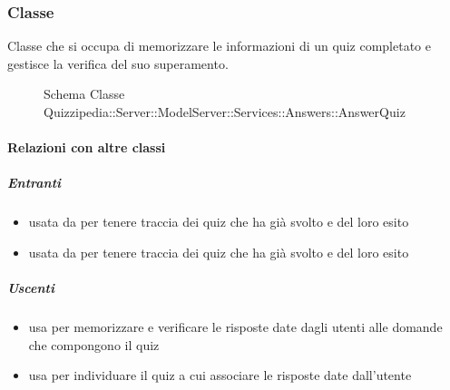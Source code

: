 \subsubsection{Classe }
Classe che si occupa di memorizzare le informazioni di un quiz completato e gestisce la verifica del suo superamento.
\begin{figure}[H]
\centering
\noindent{}
\caption[Schema Classe AnswerQuiz]{Schema Classe Quizzipedia::Server::ModelServer::Services::Answers::AnswerQuiz}
\end{figure}
\paragraph{Relazioni con altre classi}
\subparagraph{Entranti}
\begin{itemize}
\item usata da  per tenere traccia dei quiz che ha già svolto e del loro esito
\item usata da  per tenere traccia dei quiz che ha già svolto e del loro esito
\end{itemize}
\subparagraph{Uscenti}
\begin{itemize}
\item usa  per memorizzare e verificare le risposte date dagli utenti alle domande che compongono il quiz
\item usa  per individuare il quiz a cui associare le risposte date dall'utente
\end{itemize}
